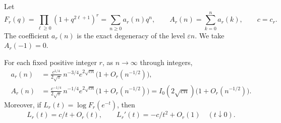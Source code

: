 Let
\[
 F_r(q)=\prod_{\ell\geq0}(1+q^{2\ell+1})^r
       =\sum_{n\geq0}a_r(n)q^n,
 \qquad A_r(n)=\sum_{k=0}^n a_r(k),\qquad c=c_r.
\]
The coefficient $a_r(n)$ is the exact degeneracy of the level
$\varepsilon n$.  We take $A_r(-1)=0$.

\begin{lemma}
\label{lem:tower-counting}
For each fixed positive integer $r$, as $n\to\infty$ through integers,
\begin{align}
 a_r(n)&=\frac{c^{1/4}}{2\sqrt\pi}\,n^{-3/4}
          e^{2\sqrt{cn}}\bigl(1+O_r(n^{-1/2})\bigr),
 \label{eq:tower-degeneracies}\\
 A_r(n)&=\frac{c^{-1/4}}{2\sqrt\pi}\,n^{-1/4}
          e^{2\sqrt{cn}}\bigl(1+O_r(n^{-1/2})\bigr)
        =I_0(2\sqrt{cn})\bigl(1+O_r(n^{-1/2})\bigr).
 \label{eq:tower-counting}
\end{align}
Moreover, if $L_r(t)=\log F_r(e^{-t})$, then
\begin{equation}\label{eq:tower-partition-estimates}
 L_r(t)=c/t+O_r(t),\qquad
 L_r'(t)=-c/t^2+O_r(1)
 \quad(t\downarrow0).
\end{equation}
\end{lemma}

